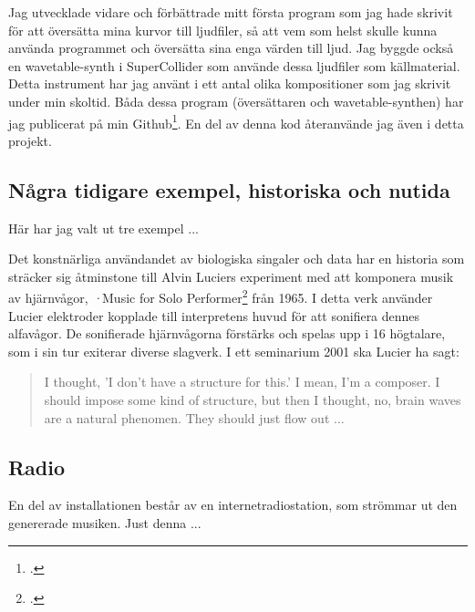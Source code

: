 \documentclass[11pt, a4paper]{article} %
\begin{document}
Jag utvecklade vidare och förbättrade mitt första program som jag hade skrivit för att översätta mina kurvor till ljudfiler, så att vem som helst skulle kunna använda programmet och översätta sina enga värden till ljud. Jag byggde också en wavetable-synth i SuperCollider som använde dessa ljudfiler som källmaterial. Detta instrument har jag använt i ett antal olika kompositioner som jag skrivit under min skoltid. Båda dessa program (översättaren och wavetable-synthen) har jag publicerat på min Github\footcite{jondell_kj-jondelldiabetes-synth_2021}. En del av denna kod återanvände jag även i detta projekt.

\subsection*{Några tidigare exempel, historiska och nutida}
Här har jag valt ut tre exempel ...

Det konstnärliga användandet av biologiska singaler och data har en historia som sträcker sig åtminstone till Alvin Luciers experiment med att komponera musik av hjärnvågor, \emph·{Music for Solo Performer}\footcite{straebel_alvin_2014} från 1965. I detta verk använder Lucier elektroder kopplade till interpretens huvud för att sonifiera dennes alfavågor. De sonifierade hjärnvågorna förstärks och spelas upp i 16 högtalare, som i sin tur exiterar diverse slagverk. I ett seminarium 2001 ska Lucier ha sagt: 

\begin{quote}
  I thought, 'I don't have a structure for this.' I mean, I'm a composer. I should impose some kind of structure, but then I thought, no, brain waves are a natural phenomen. They should just flow out ... %
\end{quote}




\subsection*{Radio}
En del av installationen består av en internetradiostation, som strömmar ut den genererade musiken. Just denna ...
\end{document}
